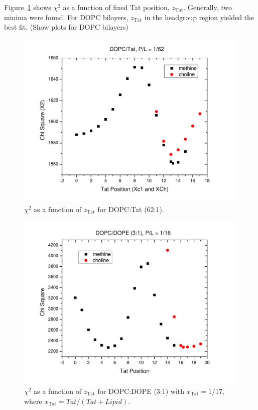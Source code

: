 \documentclass[12pt,letterpaper]{article}
\newcommand{\zTat}{z_\textrm{Tat}}
\begin{document}
Figure~\ref{fig:DOPC_Tat_62to1_X2} shows $\chi^2$ as a function of fixed Tat position, 
$\zTat$. Generally, two minima were found. For DOPC bilayers, $\zTat$ in the 
headgroup region yielded the best fit. (Show plots for DOPC bilayers)
\begin{figure}[htbp]
  \centering
  \includegraphics[scale=0.3]{./figures/SDP_Results/DOPC_Tat_62to1_X2.pdf}
  \caption{$\chi^2$ as a function of $\zTat$ for DOPC:Tat (62:1).}
  \label{fig:DOPC_Tat_62to1_X2}
\end{figure}
\begin{figure}[htbp]
  \centering
  \includegraphics[scale=0.3]{./figures/SDP_Results/DOPCDOPE3to1_Tat_16to1_X2.pdf}
  \caption{$\chi^2$ as a function of $\zTat$ for DOPC:DOPE (3:1) with 
  $x_\textrm{Tat}=1/17$, where $x_\textrm{Tat}=Tat/(Tat+Lipid)$.}
  \label{fig:DOPCDOPE3to1_Tat_16to1_X2}
\end{figure}
\end{document}
